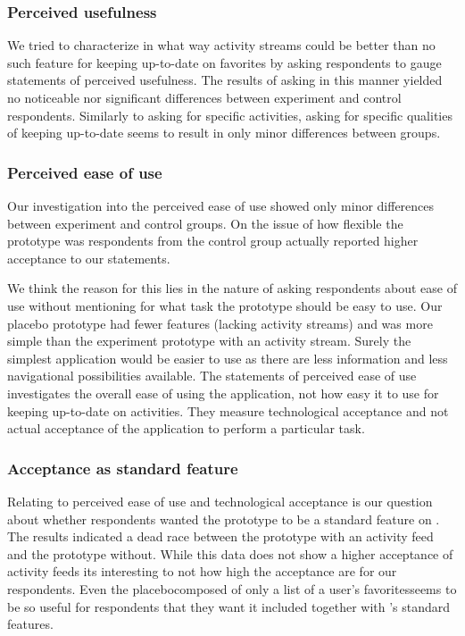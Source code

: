 \subsubsection{Perceived usefulness}

We tried to characterize in what way activity streams could be better than
no such feature for keeping up-to-date on favorites by asking respondents
to gauge statements of perceived usefulness.%
The results of asking in this manner yielded no noticeable nor significant
differences between experiment and control respondents. Similarly to asking
for specific activities, asking for specific qualities of keeping up-to-date
seems to result in only minor differences between groups.

\subsubsection{Perceived ease of use}

Our investigation into the perceived ease of use%
showed only minor differences between experiment and control groups. On the
issue of how flexible the prototype was respondents from the control group
actually reported higher acceptance to our statements.

We think the reason for
this lies in the nature of asking respondents about ease of use without
mentioning for what task the prototype should be easy to use. Our placebo
prototype had fewer features (lacking activity streams) and was more simple
than the experiment prototype with an activity stream. Surely the simplest
application would be easier to use as there are less information and less
navigational possibilities available. The statements of perceived ease of use
investigates the overall ease of using the application, not how easy it to use
for keeping up-to-date on activities. They measure technological acceptance
and not actual acceptance of the application to perform a particular task.

\subsubsection{Acceptance as standard feature}

Relating to perceived ease of use and technological acceptance is our question
about whether respondents wanted the prototype to be a standard feature
on \urort{}. The results%
indicated a dead race between the prototype with an activity feed and the
prototype without. While this data does not show a higher acceptance of
activity feeds its interesting to not how high the acceptance are for
our respondents. Even the placebo\dash{}composed of only a list of
a user's favorites\dash{}seems to be so useful for respondents that they want
it included together with \urort{}'s standard features.

